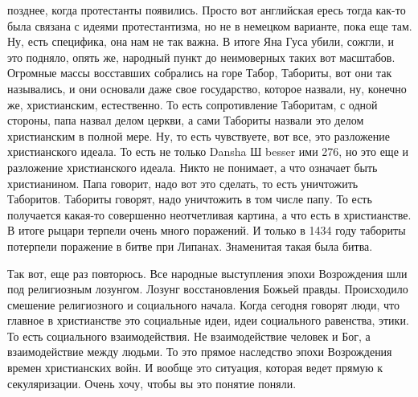 позднее, когда протестанты появились. Просто вот английская ересь тогда как-то
была связана с идеями протестантизма, но не в немецком варианте, пока еще там.
Ну, есть специфика, она нам не так важна. В итоге Яна Гуса убили, сожгли, и это
подняло, опять же, народный пункт до неимоверных таких вот масштабов. Огромные
массы восставших собрались на горе Табор, Табориты, вот они так назывались, и
они основали даже свое государство, которое назвали, ну, конечно же,
христианским, естественно. То есть сопротивление Таборитам, с одной стороны,
папа назвал делом церкви, а сами Табориты назвали это делом христианским в
полной мере. Ну, то есть чувствуете, вот все, это разложение христианского
идеала. То есть не только Dansha Ш besser ими 276, но это еще и разложение
христианского идеала. Никто не понимает, а что означает быть христианином. Папа
говорит, надо вот это сделать, то есть уничтожить Таборитов. Табориты говорят,
надо уничтожить в том числе папу. То есть получается какая-то совершенно
неотчетливая картина, а что есть в христианстве. В итоге рыцари терпели очень
много поражений. И только в 1434 году табориты потерпели поражение в битве при
Липанах. Знаменитая такая была битва. 

Так вот, еще раз повторюсь. Все народные
выступления эпохи Возрождения шли под религиозным лозунгом. Лозунг
восстановления Божьей правды. Происходило смешение религиозного и социального
начала. Когда сегодня говорят люди, что главное в христианстве это социальные
идеи, идеи социального равенства, этики. То есть социального взаимодействия. Не
взаимодействие человек и Бог, а взаимодействие между людьми. То это прямое
наследство эпохи Возрождения времен христианских войн. И вообще это ситуация,
которая ведет прямую к секуляризации. Очень хочу, чтобы вы это понятие поняли.

